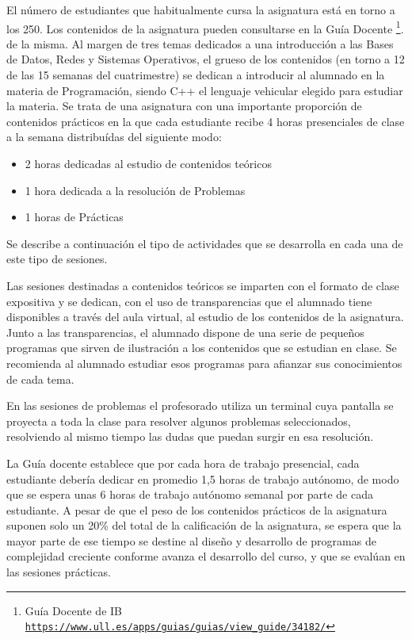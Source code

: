 \documentclass[twocolumn,twoside,a4paper, 10pt]{article}
\begin{document}
El número de estudiantes que habitualmente cursa la asignatura está en torno a los 250. 
Los contenidos de la asignatura pueden consultarse en la Guía Docente
\footnote{Guía Docente de IB\\ \href{https://www.ull.es/apps/guias/guias/view_guide/34182/}{\scriptsize{\texttt{https://www.ull.es/apps/guias/guias/view\_guide/34182/}}}}.
de la misma.
Al margen de tres temas dedicados a una introducción a las Bases de Datos, Redes y Sistemas Operativos,
el grueso de los contenidos (en torno a 12 de las 15 semanas del cuatrimestre) se dedican a introducir al
alumnado en la materia de Programación, siendo C++ el lenguaje vehicular elegido para estudiar la materia.
Se trata de una asignatura con una importante proporción de contenidos prácticos en la que cada estudiante
recibe 4 horas presenciales de clase a la semana distribuídas del siguiente modo:
\begin{itemize}
  \item 2 horas dedicadas al estudio de contenidos teóricos
  \item 1 hora dedicada a la resolución de Problemas
  \item 1 horas de Prácticas
\end{itemize}
Se describe a continuación el tipo de actividades que se desarrolla en cada una de este tipo de sesiones.

Las sesiones destinadas a contenidos teóricos se imparten con el formato de clase expositiva y se dedican, 
con el uso de transparencias que el alumnado tiene disponibles a través del aula virtual, al estudio de los 
contenidos de la asignatura. 
Junto a las transparencias, el alumnado dispone de una serie de pequeños programas que sirven de ilustración a
los contenidos que se estudian en clase. 
Se recomienda al alumnado estudiar esos programas para afianzar sus conocimientos de cada tema.

En las sesiones de problemas el profesorado utiliza un terminal cuya pantalla se proyecta a toda la clase para
resolver algunos problemas seleccionados, resolviendo al mismo tiempo las dudas que puedan surgir en esa
resolución. 

La Guía docente establece que por cada hora de trabajo presencial, cada estudiante debería dedicar en 
promedio 1,5 horas de trabajo autónomo, de modo que se espera unas 6 horas de trabajo autónomo semanal por 
parte de cada estudiante. 
A pesar de que el peso de los contenidos prácticos de la asignatura suponen solo un 20\% del total de la
calificación de la asignatura, se espera que la mayor parte de ese tiempo se destine al diseño y desarrollo 
de programas de complejidad creciente conforme avanza el desarrollo del curso, y que se evalúan en las
sesiones prácticas.
\end{document}
